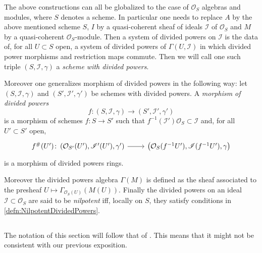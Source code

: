 \documentclass[../Main]{subfiles}
\begin{document}
\begin{rem}[]
	The above constructions can all be globalized to the case of
	$\mathcal{O}_S$ algebras and modules, where $S$ denotes a scheme.
	In particular one needs to replace $A$ by the above mentioned scheme $S$,
	$I$ by a quasi-coherent sheaf of ideals $\mathscr{I}$ of $\mathcal{O}_S$ and
	$M$ by a quasi-coherent $\mathcal{O}_S$-module.
	Then a system of divided powers on $\mathscr{I}$ is the data
	of, for all $U \subset S$ open, a system of divided powers of
	$\Gamma(U,\mathscr{I})$ in which divided power morphisms and restriction
	maps commute.
	Then we will call one such triple $\left(S, \mathscr{I}, \gamma\right)$
	a {\em scheme with divided powers}.

	Moreover one generalizes morphism of divided powers in the following way:
	let $\left(S, \mathscr{I}, \gamma\right)$ and $\left(S', \mathscr{I}', \gamma'\right)$
	be schemes with divided powers.
	A {\em morphism of divided powers}
	\begin{equation*}
	f\colon \left(S, \mathscr{I}, \gamma\right) \to 
	\left(S', \mathscr{I}', \gamma'\right)
	\end{equation*}
	is a morphism of schemes
	$f\colon S \to S'$ such that
	$f^{-1}(\mathscr{I}') \mathcal{O}_S \subset \mathscr{I}$
	and, for all $U' \subset S'$ open,
	\begin{equation*}
	\begin{tikzcd}[row sep = 0ex
		,/tikz/column 1/.append style={anchor=base east}
		,/tikz/column 2/.append style={anchor=base west}]
		f^\#(U')\colon 
		\left(\mathcal{O}_{S'}(U'), \mathscr{I}'(U'), \gamma'\right)
		\arrow[r, "", rightarrow] &
		\left(\mathcal{O}_{ S }(f^{-1}U'), \mathscr{I}(f^{-1}U'), \gamma\right)
	\end{tikzcd}
	\end{equation*} 
	is a morphism of divided powers rings.

	Moreover the divided powers algebra $\Gamma(M)$ is defined
	as the sheaf associated to the presheaf 
	$U \mapsto \Gamma_{\mathcal{O}_S(U)}(M(U))$.
	Finally the divided powers on an ideal $\mathscr{I} \subset \mathcal{O}_S$
	are said to be {\em nilpotent} iff,
	locally on $S$, they satisfy conditions in \cref{defn:NilpotentDividedPowers}.
\end{rem}


\subsection{}
The notation of this section will follow that of \cite[Capther III]{Messing}.
This means that it might not be consistent with our previous exposition.
\end{document}
